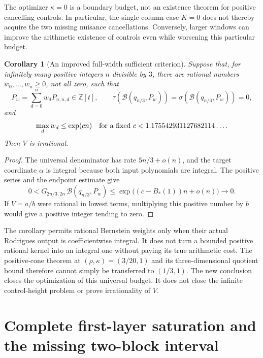 \documentclass[11pt,a4paper]{article}
\numberwithin{equation}{section}
\newtheorem{corollary}[theorem]{Corollary}
\theoremstyle{definition}\newtheorem{definition}[theorem]{Definition}
\theoremstyle{remark}\newtheorem{remark}[theorem]{Remark}
\begin{document}
The optimizer $\kappa=0$ is a boundary budget, not an existence theorem
for positive cancelling controls. In particular, the single-column
case $K=0$ does not thereby acquire the two missing nuisance
cancellations. Conversely, larger windows can improve the arithmetic
existence of controls even while worsening this particular budget.

\begin{corollary}[An improved full-width sufficient criterion]
\label{opt:taisho:newcriterion}
Suppose that, for infinitely many positive integers $n$ divisible by $3$,
there are rational numbers $w_0,\ldots,w_n\ge0$, not all zero, such that
\[
 P_w=\sum_{d=0}^n w_dP_{n,n,d}\in\mathbb Z[t],\qquad
 \tau(\mathcal B(q_{n/3},P_w))=
 \sigma(\mathcal B(q_{n/3},P_w))=0,
\]
and
\[
 \max_d w_d\le\exp(cn)
 \quad\hbox{for a fixed }c<1.175542931127682114\ldots.
\]
Then $V$ is irrational.
\end{corollary}
\begin{proof}
The universal denominator has rate $5n/3+o(n)$, and the target
coordinate $\alpha$ is integral because both input polynomials are
integral. The positive series and the endpoint estimate give
\[
 0<G_{2n/3,2n}\,\mathcal B(q_{n/3},P_w)
       \le\exp\bigl((c-B_*(1))n+o(n)\bigr)\longrightarrow0.
\]
If $V=a/b$ were rational in lowest terms, multiplying this positive
number by $b$ would give a positive integer tending to zero.
\end{proof}

The corollary permits rational Bernstein weights only when their actual
Rodrigues output is coefficientwise integral. It does not turn a bounded
positive rational kernel into an integral one without paying its true
arithmetic cost. The positive-cone theorem at $(\rho,\kappa)=(3/20,1)$
and its three-dimensional quotient bound therefore cannot simply be
transferred to $(1/3,1)$. The new conclusion closes the optimization of
this universal budget. It does not close the infinite control-height
problem or prove irrationality of $V$.


\section{Complete first-layer saturation and the missing two-block interval}
\label{sat:reiwa:newsec}
\end{document}
